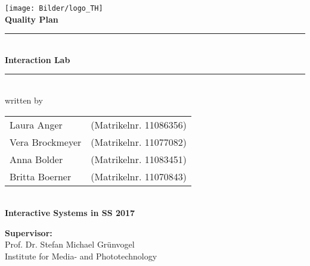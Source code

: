 \thispagestyle{empty}
\begin{center}
	\texttt{[image: Bilder/logo\_TH]}\\[12ex]
	{\Huge\textbf{Quality Plan}}\\[8ex]
	\rule{.8\textwidth}{.2pt}
	{\Large\\[1ex] \textbf{Interaction Lab}}\\
	\rule{.8\textwidth}{.2pt}\\[10ex]
	written by\\[2ex]
	\begin{tabular}{ll}
		Laura Anger &(Matrikelnr. 11086356)\\ 
		Vera Brockmeyer &(Matrikelnr. 11077082)\\
		Anna Bolder &(Matrikelnr. 11083451)\\
		Britta Boerner &(Matrikelnr. 11070843)\\
	\end{tabular}\\[10ex]
	\textbf{Interactive Systems in SS 2017}\\			
\end{center}
\vfill
\begin{flushleft}
	{\bf Supervisor:}\\
	Prof. Dr. Stefan Michael Grünvogel\\
	Institute for Media- and Phototechnology
\end{flushleft}
\newpage